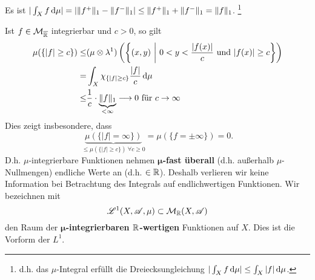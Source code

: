 \begin{beobachtung}
Es ist $|\int_X f\, \mathrm{d} \mu| = | \|f^+\|_1 - \|f^-\|_1|\leq \|f^+\|_1+\|f^-\|_1=\|f\|_1$. \footnote{d.h. das $\mu$-Integral erfüllt die Dreiecksungleichung $|\int_X f\, \mathrm{d}\mu|\leq \int_X |f|\, \mathrm{d}\mu$.}
\end{beobachtung}
Ist $f\in \mathcal{M}_{\overline{\mathbb{R}}}$ integrierbar und $c>0$, so gilt
\begin{equation*}
\begin{split}
\mu (\{|f|\geq c\}) \leq & (\mu \otimes \lambda^1) \left( \left\{ \left(x, y\right)\, \bigg\vert \  0<y<\frac{|f(x)|}{c} \text{ und } |f(x)|\geq c	\right\}\right)\\
= & \int_X \chi_{\{|f|\geq c\}}\frac{|f|}{c}\, \mathrm{d}\mu  \\
\leq & \frac{1}{c}\cdot \underbrace{\|f\|_1}_{<\infty} \longrightarrow 0 \text{ für } c\to \infty
\end{split}
\end{equation*}
Dies zeigt insbesondere, dass
\begin{equation}\label{fast-endlich}
\underbrace{\mu( \{   |f|=\infty \} )}_{\leq \mu( \{ |f|\geq c \} ) \ \forall c\geq 0} = \mu(\{  f=\pm \infty  \}) =0.
\end{equation}
D.h. $\mu$-integrierbare Funktionen nehmen $\boldsymbol\mu$\textbf{-fast überall} (d.h. außerhalb $\mu$-Nullmengen) endliche Werte an (d.h. $\in\mathbb{R}$). Deshalb verlieren wir keine Information bei Betrachtung des Integrals auf endlichwertigen Funktionen. Wir bezeichnen mit
$${\mathscr{L}^1 (X,\mathscr{A},\mu)} \subset \mathcal{M}_{\mathbb{R}} (X,\mathscr{A})$$
den Raum der \textbf{$\boldsymbol\mu$-integrierbaren $\mathbb{R}$-wertigen} Funktionen auf $X$. Dies ist die Vorform der $L^1$.
\vspace{0.5pc}
